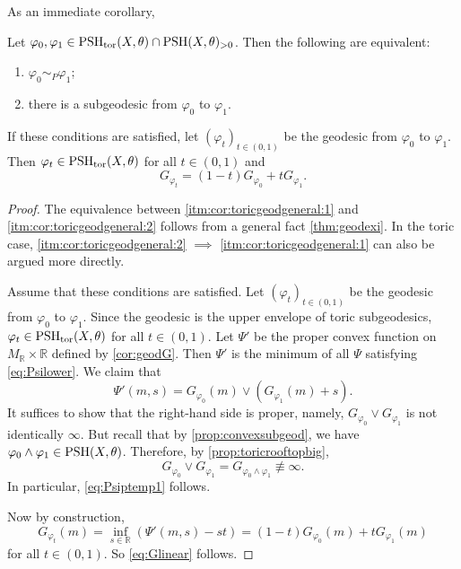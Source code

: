 As an immediate corollary,
\begin{corollary}\label{cor:toricgeodgeneral}
    Let $\varphi_0,\varphi_1\in \mathrm{PSH}_{\mathrm{tor}}(X,\theta)\cap \mathrm{PSH}(X,\theta)_{>0}$.
    Then the following are equivalent:
    \begin{enumerate}
        \item\label{itm:cor:toricgeodgeneral:1} $\varphi_0\sim_P \varphi_1$;
        \item\label{itm:cor:toricgeodgeneral:2} there is a subgeodesic from $\varphi_0$ to $\varphi_1$.
   \end{enumerate}
    If these conditions are satisfied, let $(\varphi_t)_{t\in (0,1)}$ be the geodesic from $\varphi_0$ to $\varphi_1$. Then $\varphi_t\in \mathrm{PSH}_{\mathrm{tor}}(X,\theta)$ for all $t\in (0,1)$ and
    \begin{equation}\label{eq:Glinear}
    G_{\varphi_t}=(1-t)G_{\varphi_0}+tG_{\varphi_1}.
    \end{equation}
\end{corollary}
\begin{proof}
    The equivalence between \ref{itm:cor:toricgeodgeneral:1} and \ref{itm:cor:toricgeodgeneral:2} follows from a general fact \cref{thm:geodexi}. In the toric case, \ref{itm:cor:toricgeodgeneral:2} $\implies$ \ref{itm:cor:toricgeodgeneral:1} can also be argued more directly.

    Assume that these conditions are satisfied. Let $(\varphi_t)_{t\in (0,1)}$ be the geodesic from $\varphi_0$ to $\varphi_1$. Since the geodesic is the upper envelope of toric subgeodesics, $\varphi_t\in \mathrm{PSH}_{\mathrm{tor}}(X,\theta)$ for all $t\in (0,1)$. Let $\Psi'$ be the proper convex function on $M_{\mathbb{R}}\times \mathbb{R}$ defined by \cref{cor:geodG}. Then $\Psi'$ is the minimum of all $\Psi$ satisfying \eqref{eq:Psilower}. We claim that
    \begin{equation}\label{eq:Psiptemp1}
    \Psi'(m,s)=G_{\varphi_0}(m)\lor \left(G_{\varphi_1}(m)+s\right).
    \end{equation}
    It suffices to show that the right-hand side is proper, namely, $G_{\varphi_0}\lor G_{\varphi_1}$ is not identically $\infty$. But recall that by \cref{prop:convexsubgeod}, we have $\varphi_0\land \varphi_1\in \mathrm{PSH}(X,\theta)$. Therefore, by \cref{prop:toricrooftopbig},
    \[
    G_{\varphi_0}\lor G_{\varphi_1}=G_{\varphi_0\land \varphi_1}\not\equiv \infty.
    \]
    In particular, \eqref{eq:Psiptemp1} follows.

    Now by construction,
    \[
    G_{\varphi_t}(m)=\inf_{s\in \mathbb{R}} \left( \Psi'(m,s)-st\right)=(1-t)G_{\varphi_0}(m)+tG_{\varphi_1}(m)
    \]
    for all $t\in (0,1)$. So \eqref{eq:Glinear} follows.
\end{proof}

